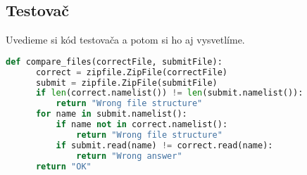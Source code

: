 \subsection{Testovač}
Uvedieme si kód testovača a potom si ho aj vysvetlíme.
\begin{lstlisting}[language=Python]
  def compare_files(correctFile, submitFile):
      correct = zipfile.ZipFile(correctFile)
      submit = zipfile.ZipFile(submitFile)
      if len(correct.namelist()) != len(submit.namelist()):
          return "Wrong file structure"
      for name in submit.namelist():
          if name not in correct.namelist():
              return "Wrong file structure"
          if submit.read(name) != correct.read(name):
              return "Wrong answer"
      return "OK"
\end{lstlisting}
